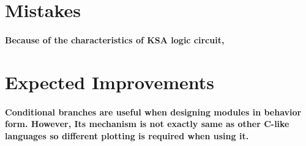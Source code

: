 \documentclass[a4paper]{report}
\begin{document}
        \section{Mistakes}
            \paragraph{\normalfont Because of the characteristics of KSA logic circuit, }

        \section{Expected Improvements}
            \paragraph{\normalfont Conditional branches are useful when designing modules in behavior form. However, Its mechanism is not exactly same as other C-like languages so different plotting is required when using it.}
\end{document}
